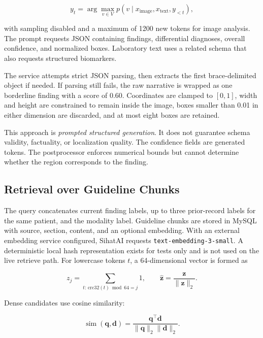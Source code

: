 \documentclass[conference]{IEEEtran}
\begin{document}
\begin{equation}
 y_t = \arg\max_{v \in V} p(v \mid x_\mathrm{image},x_\mathrm{text},y_{<t}),
\end{equation}

with sampling disabled and a maximum of 1200 new tokens for image analysis. The prompt requests JSON containing findings, differential diagnoses, overall confidence, and normalized boxes. Laboratory text uses a related schema that also requests structured biomarkers.

The service attempts strict JSON parsing, then extracts the first brace-delimited object if needed. If parsing still fails, the raw narrative is wrapped as one borderline finding with a score of 0.60. Coordinates are clamped to \([0,1]\), width and height are constrained to remain inside the image, boxes smaller than 0.01 in either dimension are discarded, and at most eight boxes are retained.

This approach is \emph{prompted structured generation}. It does not guarantee schema validity, factuality, or localization quality. The confidence fields are generated tokens. The postprocessor enforces numerical bounds but cannot determine whether the region corresponds to the finding.

\subsection{Retrieval over Guideline Chunks}

The query concatenates current finding labels, up to three prior-record labels for the same patient, and the modality label. Guideline chunks are stored in MySQL with source, section, content, and an optional embedding. With an external embedding service configured, SihatAI requests \texttt{text-embedding-3-small}. A deterministic local hash representation exists for tests only and is not used on the live retrieve path. For lowercase tokens \(t\), a 64-dimensional vector is formed as

\begin{equation}
  z_j = \sum_{t:\,\mathrm{crc32}(t)\bmod64=j} 1,\qquad
  \hat{\mathbf z} = \frac{\mathbf z}{\|\mathbf z\|_2}.
\end{equation}

Dense candidates use cosine similarity:

\begin{equation}
 \operatorname{sim}(\mathbf q,\mathbf d)=
 \frac{\mathbf q^\top\mathbf d}{\|\mathbf q\|_2\|\mathbf d\|_2}.
\end{equation}
\end{document}
